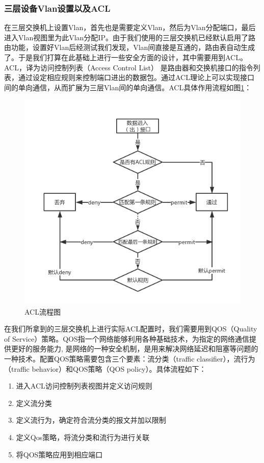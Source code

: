 	\subsubsection{三层设备Vlan设置以及ACL}%
\indent	在三层交换机上设置Vlan，首先也是需要定义Vlan，然后为Vlan分配端口，最后进入Vlan视图里为此Vlan分配IP。由于我们使用的三层交换机已经默认启用了路由功能，设置好Vlan后经测试我们发现，Vlan间直接是互通的，路由表自动生成了。于是我们打算在此基础上进行一些安全方面的设计，其中需要用到ACL。\\
\indent	ACL，译为访问控制列表（Access Control List） 是路由器和交换机接口的指令列表，通过设定相应规则来控制端口进出的数据包。通过ACL理论上可以实现接口间的单向通信，从而扩展为三层Vlan间的单向通信。ACL具体作用流程如图\ref{fig:safe_3}：\\
\begin{figure}[thbp!]
\centering
\includegraphics[width=0.7\linewidth]{figure/safe_3.png}
\caption{ACL流程图}
\label{fig:safe_3}
\end{figure}
\indent 在我们所拿到的三层交换机上进行实际ACL配置时，我们需要用到QOS（Quality of Service）策略。QOS指一个网络能够利用各种基础技术，为指定的网络通信提供更好的服务能力, 是网络的一种安全机制，是用来解决网络延迟和阻塞等问题的一种技术。配置QOS策略需要包含三个要素：流分类（traffic classifier），流行为（traffic behavior）和QOS策略（QOS policy）。具体流程如下：\\
\begin{enumerate}
\item 进入ACL访问控制列表视图并定义访问规则
\item 定义流分类
\item 定义流行为，确定符合流分类的报文并加以限制
\item 定义Qos策略，将流分类和流行为进行关联
\item 将QOS策略应用到相应端口
\end{enumerate}

